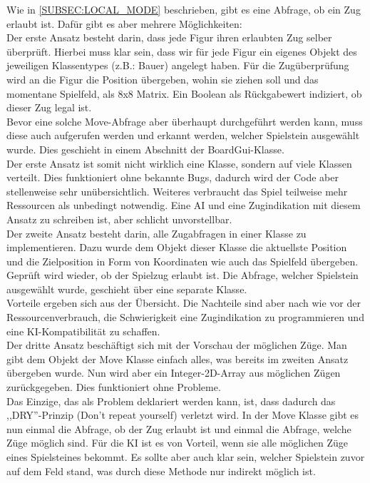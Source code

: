 \documentclass[12pt,a4paper]{article}
\begin{document}
Wie in \ref{SUBSEC:LOCAL_MODE} beschrieben, gibt es eine Abfrage, ob ein Zug erlaubt ist. Dafür gibt es aber mehrere Möglichkeiten:\\
Der erste Ansatz besteht darin, dass jede Figur ihren erlaubten Zug selber überprüft. Hierbei muss klar sein, dass wir für jede Figur ein eigenes Objekt des jeweiligen Klassentypes (z.B.: Bauer) angelegt haben. Für die Zugüberprüfung wird an die Figur die Position übergeben, wohin sie ziehen soll und das momentane Spielfeld, als 8x8 Matrix. Ein Boolean als Rückgabewert indiziert, ob dieser Zug legal ist. \\
Bevor eine solche Move-Abfrage aber überhaupt durchgeführt werden kann, muss diese auch aufgerufen werden und erkannt werden, welcher Spielstein ausgewählt wurde. Dies geschieht in einem Abschnitt der BoardGui-Klasse. \\
Der erste Ansatz ist somit nicht wirklich eine Klasse, sondern auf viele Klassen verteilt. Dies funktioniert ohne bekannte Bugs, dadurch wird der Code aber stellenweise sehr unübersichtlich. Weiteres verbraucht das Spiel teilweise mehr Ressourcen als unbedingt notwendig. Eine AI und eine Zugindikation mit diesem Ansatz zu schreiben ist, aber schlicht unvorstellbar. \\[2ex]
Der zweite Ansatz besteht darin, alle Zugabfragen in einer Klasse zu implementieren. Dazu wurde dem Objekt dieser Klasse die aktuellste Position und die Zielposition in Form von Koordinaten wie auch das Spielfeld übergeben. Geprüft wird wieder, ob der Spielzug erlaubt ist. Die Abfrage, welcher Spielstein ausgewählt wurde, geschieht über eine separate Klasse.\\ 
Vorteile ergeben sich aus der Übersicht. Die Nachteile sind aber nach wie vor der Ressourcenverbrauch, die Schwierigkeit eine Zugindikation zu programmieren und eine KI-Kompatibilität zu schaffen.\\[2ex]
Der dritte Ansatz beschäftigt sich mit der Vorschau der möglichen Züge. Man gibt dem Objekt der Move Klasse einfach alles, was bereits im zweiten Ansatz übergeben wurde. Nun wird aber ein Integer-2D-Array aus möglichen Zügen zurückgegeben. Dies funktioniert ohne Probleme. \\
Das Einzige, das als Problem deklariert werden kann, ist, dass dadurch das ,,DRY''-Prinzip (Don't repeat yourself)  verletzt wird. In der Move Klasse gibt es nun einmal die Abfrage, ob der Zug erlaubt ist und einmal die Abfrage, welche Züge möglich sind. Für die KI ist es von Vorteil, wenn sie alle möglichen Züge eines Spielsteines bekommt. Es sollte aber auch klar sein, welcher Spielstein zuvor auf dem Feld stand, was durch diese Methode nur indirekt möglich ist. \\[2ex]
\end{document}
